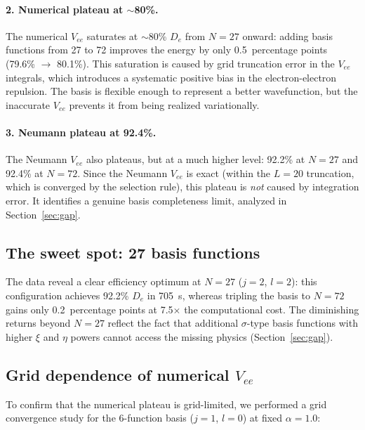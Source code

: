 \documentclass[aps,pra,twocolumn,superscriptaddress,longbibliography]{revtex4-2}
\begin{document}
\paragraph{2. Numerical plateau at $\sim$80\%.}
The numerical $V_{ee}$ saturates at $\sim$80\% $D_e$ from
$N = 27$ onward: adding basis functions from 27 to 72 improves
the energy by only 0.5~percentage points (79.6\% $\to$ 80.1\%).
This saturation is caused by grid truncation error in the
$V_{ee}$ integrals, which introduces a systematic positive bias
in the electron-electron repulsion.  The basis is flexible
enough to represent a better wavefunction, but the inaccurate
$V_{ee}$ prevents it from being realized variationally.

\paragraph{3. Neumann plateau at 92.4\%.}
The Neumann $V_{ee}$ also plateaus, but at a much higher
level: 92.2\% at $N = 27$ and 92.4\% at $N = 72$.  Since the
Neumann $V_{ee}$ is exact (within the $L = 20$ truncation,
which is converged by the selection rule), this plateau is
\emph{not} caused by integration error.  It identifies a genuine
basis completeness limit, analyzed in Section~\ref{sec:gap}.

\subsection{The sweet spot: 27 basis functions}

The data reveal a clear efficiency optimum at $N = 27$
($j = 2$, $l = 2$): this configuration achieves 92.2\% $D_e$
in 705~s, whereas tripling the basis to $N = 72$ gains only
0.2~percentage points at 7.5$\times$ the computational cost.
The diminishing returns beyond $N = 27$ reflect the fact that
additional $\sigma$-type basis functions with higher $\xi$
and $\eta$ powers cannot access the missing physics
(Section~\ref{sec:gap}).

\subsection{Grid dependence of numerical \texorpdfstring{$V_{ee}$}{Vee}}

To confirm that the numerical plateau is grid-limited, we
performed a grid convergence study for the 6-function basis
($j = 1$, $l = 0$) at fixed $\alpha = 1.0$:
\end{document}
